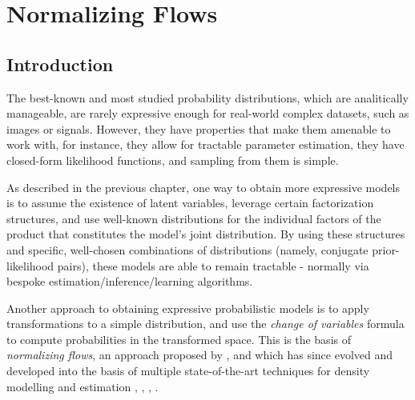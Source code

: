 \chapter{Normalizing Flows}
\label{chapter:probmodel}

\section{Introduction}
The best-known and most studied probability distributions, which are analitically
manageable, are rarely expressive enough for real-world complex datasets, such
as images or signals. However, they have properties that make them amenable to
work with, for instance, they allow for tractable parameter estimation,
they have closed-form likelihood functions, and sampling from them is simple.

As described in the previous chapter, one way to obtain more expressive models is
to assume the existence of latent variables, leverage certain factorization
structures, and use well-known distributions for the individual factors of the product that
constitutes the model's joint distribution. By using these structures and
specific, well-chosen combinations of distributions (namely, conjugate prior-likelihood pairs),
these models are able to remain tractable - normally via bespoke estimation/inference/learning
algorithms.

Another approach to obtaining expressive probabilistic models is to apply
transformations to a simple distribution, and use the \emph{change of variables}
formula to compute probabilities in the transformed space. This is the basis
of \emph{normalizing flows}, an approach proposed by \textcite{shakir_nf},
and which has since evolved and developed into the basis of multiple state-of-the-art
techniques for density modelling and estimation \autocite{Glow}, \autocite{real-nvp}, \autocite{bnaf19},
\autocite{maf}.

